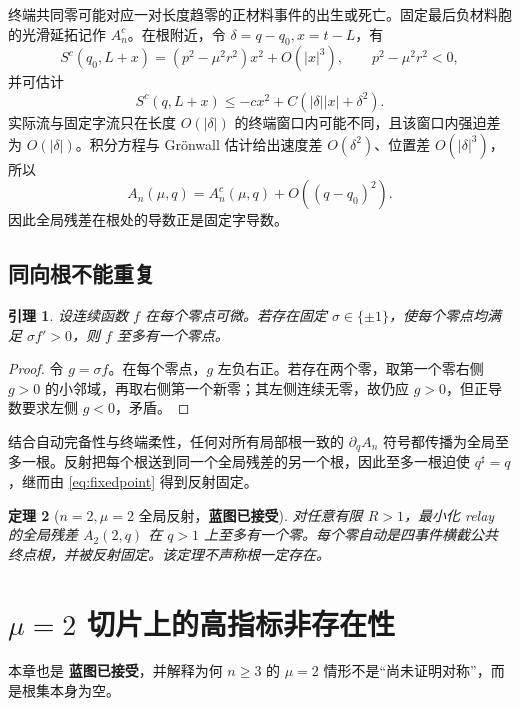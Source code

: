 \documentclass[UTF8,12pt,openany,fontset=fandol]{ctexrep}
\newtheorem{theorem}{定理}[chapter]
\newtheorem{lemma}[theorem]{引理}
\theoremstyle{definition}
\newcommand{\Trusted}{\textcolor{green!45!black}{\textbf{蓝图已接受}}}
\begin{document}
终端共同零可能对应一对长度趋零的正材料事件的出生或死亡。固定最后负材料胞的光滑延拓记作 $A_n^c$。在根附近，令 $\delta=q-q_0,x=t-L$，有
\begin{equation}
 S^c(q_0,L+x)=(p^2-\mu^2r^2)x^2+O(|x|^3),\qquad p^2-\mu^2r^2<0,
\end{equation}
并可估计
\begin{equation}
 S^c(q,L+x)\le-cx^2+C(|\delta||x|+\delta^2).
\end{equation}
实际流与固定字流只在长度 $O(|\delta|)$ 的终端窗口内可能不同，且该窗口内强迫差为 $O(|\delta|)$。积分方程与 Grönwall 估计给出速度差 $O(\delta^2)$、位置差 $O(|\delta|^3)$，所以
\begin{equation}
 A_n(\mu,q)=A_n^c(\mu,q)+O((q-q_0)^2).
\end{equation}
因此全局残差在根处的导数正是固定字导数。

\section{同向根不能重复}

\begin{lemma}
设连续函数 $f$ 在每个零点可微。若存在固定 $\sigma\in\{\pm1\}$，使每个零点均满足 $\sigma f'>0$，则 $f$ 至多有一个零点。
\end{lemma}
\begin{proof}
令 $g=\sigma f$。在每个零点，$g$ 左负右正。若存在两个零，取第一个零右侧 $g>0$ 的小邻域，再取右侧第一个新零；其左侧连续无零，故仍应 $g>0$，但正导数要求左侧 $g<0$，矛盾。
\end{proof}

结合自动完备性与终端柔性，任何对所有局部根一致的 $\partial_qA_n$ 符号都传播为全局至多一根。反射把每个根送到同一个全局残差的另一个根，因此至多一根迫使 $q^\sharp=q$，继而由 \eqref{eq:fixedpoint} 得到反射固定。

\begin{theorem}[$n=2,\mu=2$ 全局反射，\Trusted]\label{thm:global-mu2}
对任意有限 $R>1$，最小化 relay 的全局残差 $A_2(2,q)$ 在 $q>1$ 上至多有一个零。每个零自动是四事件横截公共终点根，并被反射固定。该定理不声称根一定存在。
\end{theorem}

\chapter{$\mu=2$ 切片上的高指标非存在性}

本章也是 \Trusted，并解释为何 $n\ge3$ 的 $\mu=2$ 情形不是“尚未证明对称”，而是根集本身为空。
\end{document}
